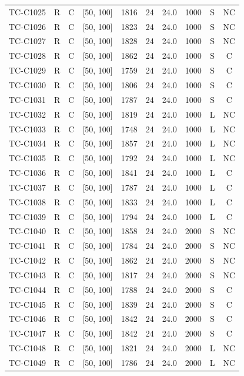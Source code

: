 \begin{longtable}{lccccccccc}
TC-C1025 & R & C & [50, 100] & 1816 & 24 & 24.0 & 1000 & S & NC \\
TC-C1026 & R & C & [50, 100] & 1823 & 24 & 24.0 & 1000 & S & NC \\
TC-C1027 & R & C & [50, 100] & 1828 & 24 & 24.0 & 1000 & S & NC \\
TC-C1028 & R & C & [50, 100] & 1862 & 24 & 24.0 & 1000 & S & C \\
TC-C1029 & R & C & [50, 100] & 1759 & 24 & 24.0 & 1000 & S & C \\
TC-C1030 & R & C & [50, 100] & 1806 & 24 & 24.0 & 1000 & S & C \\
TC-C1031 & R & C & [50, 100] & 1787 & 24 & 24.0 & 1000 & S & C \\
TC-C1032 & R & C & [50, 100] & 1819 & 24 & 24.0 & 1000 & L & NC \\
TC-C1033 & R & C & [50, 100] & 1748 & 24 & 24.0 & 1000 & L & NC \\
TC-C1034 & R & C & [50, 100] & 1857 & 24 & 24.0 & 1000 & L & NC \\
TC-C1035 & R & C & [50, 100] & 1792 & 24 & 24.0 & 1000 & L & NC \\
TC-C1036 & R & C & [50, 100] & 1841 & 24 & 24.0 & 1000 & L & C \\
TC-C1037 & R & C & [50, 100] & 1787 & 24 & 24.0 & 1000 & L & C \\
TC-C1038 & R & C & [50, 100] & 1833 & 24 & 24.0 & 1000 & L & C \\
TC-C1039 & R & C & [50, 100] & 1794 & 24 & 24.0 & 1000 & L & C \\
TC-C1040 & R & C & [50, 100] & 1858 & 24 & 24.0 & 2000 & S & NC \\
TC-C1041 & R & C & [50, 100] & 1784 & 24 & 24.0 & 2000 & S & NC \\
TC-C1042 & R & C & [50, 100] & 1862 & 24 & 24.0 & 2000 & S & NC \\
TC-C1043 & R & C & [50, 100] & 1817 & 24 & 24.0 & 2000 & S & NC \\
TC-C1044 & R & C & [50, 100] & 1788 & 24 & 24.0 & 2000 & S & C \\
TC-C1045 & R & C & [50, 100] & 1839 & 24 & 24.0 & 2000 & S & C \\
TC-C1046 & R & C & [50, 100] & 1842 & 24 & 24.0 & 2000 & S & C \\
TC-C1047 & R & C & [50, 100] & 1842 & 24 & 24.0 & 2000 & S & C \\
TC-C1048 & R & C & [50, 100] & 1821 & 24 & 24.0 & 2000 & L & NC \\
TC-C1049 & R & C & [50, 100] & 1786 & 24 & 24.0 & 2000 & L & NC \\

\end{longtable}
